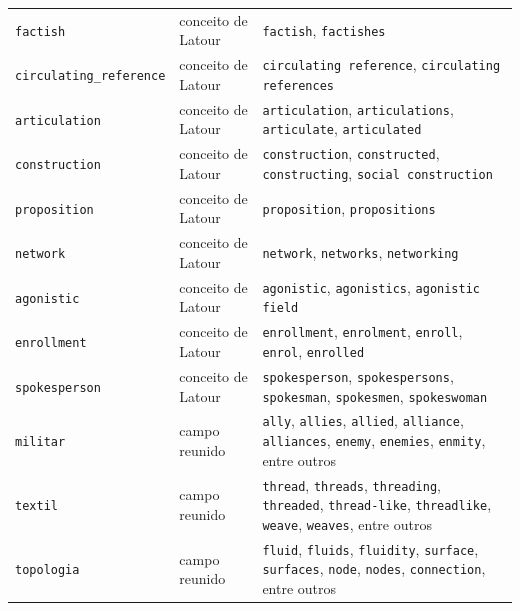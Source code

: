 \begin{longtable}{@{}p{} p{} p{}@{}}
\texttt{factish} & conceito de Latour & \texttt{factish}, \texttt{factishes} \\
\texttt{circulating\_reference} & conceito de Latour & \texttt{circulating reference}, \texttt{circulating references} \\
\texttt{articulation} & conceito de Latour & \texttt{articulation}, \texttt{articulations}, \texttt{articulate}, \texttt{articulated} \\
\texttt{construction} & conceito de Latour & \texttt{construction}, \texttt{constructed}, \texttt{constructing}, \texttt{social construction} \\
\texttt{proposition} & conceito de Latour & \texttt{proposition}, \texttt{propositions} \\
\texttt{network} & conceito de Latour & \texttt{network}, \texttt{networks}, \texttt{networking} \\
\texttt{agonistic} & conceito de Latour & \texttt{agonistic}, \texttt{agonistics}, \texttt{agonistic field} \\
\texttt{enrollment} & conceito de Latour & \texttt{enrollment}, \texttt{enrolment}, \texttt{enroll}, \texttt{enrol}, \texttt{enrolled} \\
\texttt{spokesperson} & conceito de Latour & \texttt{spokesperson}, \texttt{spokespersons}, \texttt{spokesman}, \texttt{spokesmen}, \texttt{spokeswoman} \\
\texttt{militar} & campo reunido & \texttt{ally}, \texttt{allies}, \texttt{allied}, \texttt{alliance}, \texttt{alliances}, \texttt{enemy}, \texttt{enemies}, \texttt{enmity}, entre outros \\
\texttt{textil} & campo reunido & \texttt{thread}, \texttt{threads}, \texttt{threading}, \texttt{threaded}, \texttt{thread-like}, \texttt{threadlike}, \texttt{weave}, \texttt{weaves}, entre outros \\
\texttt{topologia} & campo reunido & \texttt{fluid}, \texttt{fluids}, \texttt{fluidity}, \texttt{surface}, \texttt{surfaces}, \texttt{node}, \texttt{nodes}, \texttt{connection}, entre outros \\
\end{longtable}


